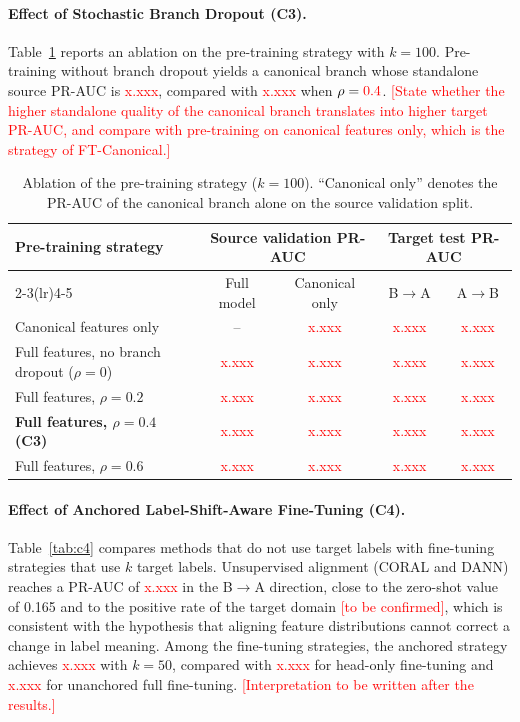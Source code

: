 \documentclass[runningheads]{llncs}
\newcommand{\tbd}[1]{\textcolor{red}{#1}}
\newcommand{\x}{\tbd{x.xxx}}
\begin{document}
\paragraph{Effect of Stochastic Branch Dropout (C3).}
Table~\ref{tab:c3} reports an ablation on the pre-training strategy with $k=100$. Pre-training without branch dropout yields a canonical branch whose standalone source PR-AUC is \x{}, compared with \x{} when $\rho=\tbd{0.4}$. \tbd{[State whether the higher standalone quality of the canonical branch translates into higher target PR-AUC, and compare with pre-training on canonical features only, which is the strategy of FT-Canonical.]}

\begin{table}[t]
\centering
\caption{Ablation of the pre-training strategy ($k=100$). ``Canonical only'' denotes the PR-AUC of the canonical branch alone on the source validation split.}\label{tab:c3}
\scriptsize
\setlength{\tabcolsep}{4pt}
\begin{tabular}{@{}lcccc@{}}
\toprule
\multirow{2}{*}{Pre-training strategy} & \multicolumn{2}{c}{Source validation PR-AUC} & \multicolumn{2}{c}{Target test PR-AUC} \\
\cmidrule(lr){2-3}\cmidrule(lr){4-5}
 & Full model & Canonical only & B$\to$A & A$\to$B \\
\midrule
Canonical features only & -- & \x & \x & \x \\
Full features, no branch dropout ($\rho=0$) & \x & \x & \x & \x \\
Full features, $\rho=0.2$ & \x & \x & \x & \x \\
\textbf{Full features, $\rho=0.4$ (C3)} & \x & \x & \x & \x \\
Full features, $\rho=0.6$ & \x & \x & \x & \x \\
\bottomrule
\end{tabular}
\end{table}

\paragraph{Effect of Anchored Label-Shift-Aware Fine-Tuning (C4).}
Table~\ref{tab:c4} compares methods that do not use target labels with fine-tuning strategies that use $k$ target labels. Unsupervised alignment (CORAL and DANN) reaches a PR-AUC of \x{} in the B$\to$A direction, close to the zero-shot value of 0.165 and to the positive rate of the target domain \tbd{[to be confirmed]}, which is consistent with the hypothesis that aligning feature distributions cannot correct a change in label meaning. Among the fine-tuning strategies, the anchored strategy achieves \x{} with $k=50$, compared with \x{} for head-only fine-tuning and \x{} for unanchored full fine-tuning. \tbd{[Interpretation to be written after the results.]}
\end{document}
